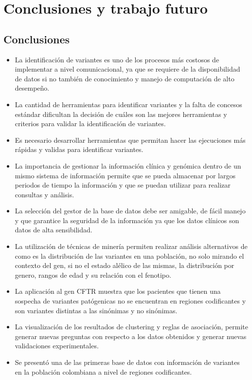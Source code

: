 \chapter{Conclusiones y trabajo futuro}

\section{Conclusiones}

\begin{itemize}
	\item La identificación de variantes es uno de los procesos más costosos de implementar a nivel comunicacional, ya que se requiere de la disponibilidad de datos si no también de conocimiento y manejo de computación de alto desempeño.
	
	\item La cantidad de herramientas para identificar variantes y la falta de concesos estándar dificultan la decisión de cuáles son las mejores herramientas y criterios para validar la identificación de variantes.
	
	\item Es necesario desarrollar herramientas que permitan hacer las ejecuciones más rápidas y validas para identificar variantes. 
	
	\item La importancia de gestionar la información clínica y genómica dentro de un mismo sistema de información permite que se pueda almacenar por largos periodos de tiempo la información y  que se puedan utilizar para realizar consultas y análisis. 
	
	\item La selección del gestor de la base de datos debe ser amigable, de fácil manejo y que garantice la seguridad de la información ya que los datos clínicos son datos de alta sensibilidad.
	
	\item La utilización de técnicas de minería permiten realizar análisis alternativos de como es la distribución de las variantes en una población, no solo mirando el contexto del gen, si no el estado alélico de las mismas, la distribución por genero, rangos de edad y su relación con el fenotipo.
	
	\item La aplicación al gen CFTR muestra que los pacientes que tienen una sospecha de variantes patógenicas no se encuentran en regiones codificantes y son variantes distintas a las sinónimas y no sinónimas.
	
	\item La visualización de los resultados de clustering y reglas de asociación, permite generar nuevas preguntas con respecto a los datos obtenidos y generar nuevas validaciones experimentales.
	
	\item Se presentó una de las primeras base de datos con información de variantes en la población colombiana a nivel de regiones codificantes.
	 
\end{itemize}

